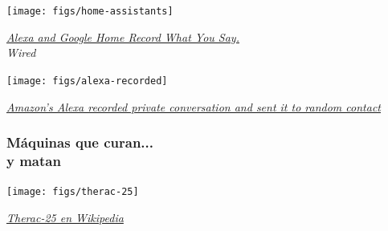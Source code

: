 \documentclass[17pt,aspectratio=169]{beamer}
\begin{document}
\begin{frame}[fragile]

  \begin{center}
  \texttt{[image: figs/home-assistants]}
  \end{center}

  \begin{flushright}
    {\em
      \href{https://www.wired.com/2016/12/alexa-and-google-record-your-voice/}{Alexa and Google Home Record What You Say.} \\
      Wired \\
      }
  \end{flushright}
  
\end{frame}

\begin{frame}[fragile]

  \begin{center}
  \texttt{[image: figs/alexa-recorded]}
  \end{center}

  \begin{flushright}
    {\em \tiny
      \href{https://www.theguardian.com/technology/2018/may/24/amazon-alexa-recorded-conversation}{Amazon's Alexa recorded private conversation and sent it to random contact}}
  \end{flushright}
  
\end{frame}

\begin{frame}[fragile]
\frametitle{Máquinas que curan... \\ y matan}

  \begin{center}
  \texttt{[image: figs/therac-25]}
  \end{center}

  \begin{flushright}
    {\em \tiny
      \href{https://en.wikipedia.org/wiki/Therac-25}{Therac-25 en Wikipedia}}
  \end{flushright}
  
\end{frame}

\end{document}

